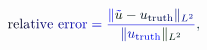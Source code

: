 \documentclass[12pt]{article}
\begin{document}
\makeatletter
\renewcommand*{\@textcolor}[3]{%
  \protect\leavevmode
  \begingroup
    \color#1{#2}#3%
  \endgroup
}
\makeatother
\begin{displaymath}
\mathrm { \mathcolor[RGB]{0,0,15}{r} \mathcolor[RGB]{0,0,30}{e} \mathcolor[RGB]{0,0,45}{l} \mathcolor[RGB]{0,0,60}{a} \mathcolor[RGB]{0,0,75}{t} \mathcolor[RGB]{0,0,90}{i} \mathcolor[RGB]{0,0,105}{v} \mathcolor[RGB]{0,0,120}{e} ~ \mathcolor[RGB]{0,0,135}{e} \mathcolor[RGB]{0,0,150}{r} \mathcolor[RGB]{0,0,165}{r} \mathcolor[RGB]{0,0,180}{o} \mathcolor[RGB]{0,0,195}{r} } \mathcolor[RGB]{0,0,210}{=} \mathcolor[RGB]{0,0,225}{\frac { \mathcolor[RGB]{0,0,240}{\|} \mathcolor[RGB]{0,0,255}{\tilde { \mathcolor[RGB]{0,15,0}{u} } } \mathcolor[RGB]{0,15,15}{-} \mathcolor[RGB]{0,15,30}{u} _ { \mathrm { \mathcolor[RGB]{0,15,45}{t} \mathcolor[RGB]{0,15,60}{r} \mathcolor[RGB]{0,15,75}{u} \mathcolor[RGB]{0,15,90}{t} \mathcolor[RGB]{0,15,105}{h} } } \mathcolor[RGB]{0,15,120}{\|} _ { \mathcolor[RGB]{0,15,135}{L} ^ { \mathcolor[RGB]{0,15,150}{2} } } } { \mathcolor[RGB]{0,15,165}{\|} \mathcolor[RGB]{0,15,180}{u} _ { \mathrm { \mathcolor[RGB]{0,15,195}{t} \mathcolor[RGB]{0,15,210}{r} \mathcolor[RGB]{0,15,225}{u} \mathcolor[RGB]{0,15,240}{t} \mathcolor[RGB]{0,15,255}{h} } } \mathcolor[RGB]{0,30,0}{\|} _ { \mathcolor[RGB]{0,30,15}{L} ^ { \mathcolor[RGB]{0,30,30}{2} } } } } \mathcolor[RGB]{0,30,45}{,}
\end{displaymath}
\end{document}

